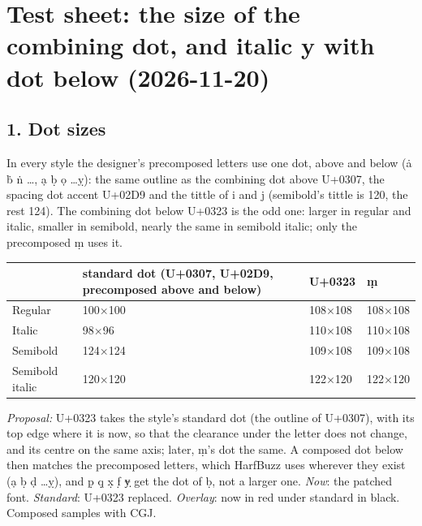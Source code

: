 \documentclass[10pt]{article}
\begin{document}
\section*{Test sheet: the size of the combining dot, and italic y with dot below (2026-11-20)}
\subsection*{1. Dot sizes}
In every style the designer's precomposed letters use one dot, above and below (ȧ ḃ ṅ \ldots, ạ ḅ ọ \ldots ỵ): the same outline as the combining dot above U+0307, the spacing dot accent U+02D9 and the tittle of i and j (semibold's tittle is 120, the rest 124).
The combining dot below U+0323 is the odd one: larger in regular and italic, smaller in semibold, nearly the same in semibold italic; only the precomposed ṃ uses it.

\smallskip
\begin{tabular}{l l l l}
 & standard dot (U+0307, U+02D9, precomposed above and below) & U+0323 & ṃ \\ \hline
Regular & 100×100 & 108×108 & 108×108 \\
Italic & 98×96 & 110×108 & 110×108 \\
Semibold & 124×124 & 109×108 & 109×108 \\
Semibold italic & 120×120 & 122×120 & 122×120 \\
\end{tabular}

\smallskip
\emph{Proposal:} U+0323 takes the style's standard dot (the outline of U+0307), with its top edge where it is now, so that the clearance under the letter does not change, and its centre on the same axis; later, ṃ's dot the same.
A composed dot below then matches the precomposed letters, which HarfBuzz uses wherever they exist (ạ ḅ ḍ \ldots ỵ), and p̣ q̣ x̣ f̣ ɏ̣ get the dot of ḅ, not a larger one.
\emph{Now}: the patched font. \emph{Standard}: U+0323 replaced. \emph{Overlay}: now in \textcolor{under}{red} under standard in black. Composed samples with CGJ.
\end{document}
